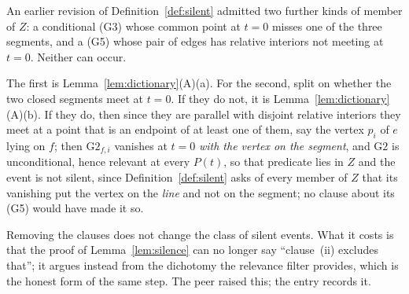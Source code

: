 \begin{remark}
\label{rem:silentclauses}
An earlier revision of Definition~\ref{def:silent} admitted two further kinds of
member of $Z$: a conditional (G3) whose common point at $t=0$ misses one of the
three segments, and a (G5) whose pair of edges has relative interiors not
meeting at $t=0$. Neither can occur.

The first is Lemma~\ref{lem:dictionary}(A)(a). For the second, split on whether
the two closed segments meet at $t=0$. If they do not, it is
Lemma~\ref{lem:dictionary}(A)(b). If they do, then since they are parallel
with disjoint relative interiors they meet at a point that is an endpoint of at
least one of them, say the vertex $p_i$ of $e$ lying on $f$; then
$\mathrm{G2}_{f,i}$ vanishes at $t=0$ \emph{with the vertex on the segment}, and
$\mathrm{G2}$ is unconditional, hence relevant at every $P(t)$, so that
predicate lies in $Z$ and the event is not silent, since
Definition~\ref{def:silent} asks of every member of $Z$ that its vanishing put
the vertex on the \emph{line} and not on the segment; no clause about its (G5)
would have made it so.

Removing the clauses does not change the class of silent events. What it costs
is that the proof of Lemma~\ref{lem:silence} can no longer say ``clause~(ii)
excludes that''; it argues instead from the dichotomy the relevance filter
provides, which is the honest form of the same step. The peer raised this; the
entry records it.
\end{remark}


